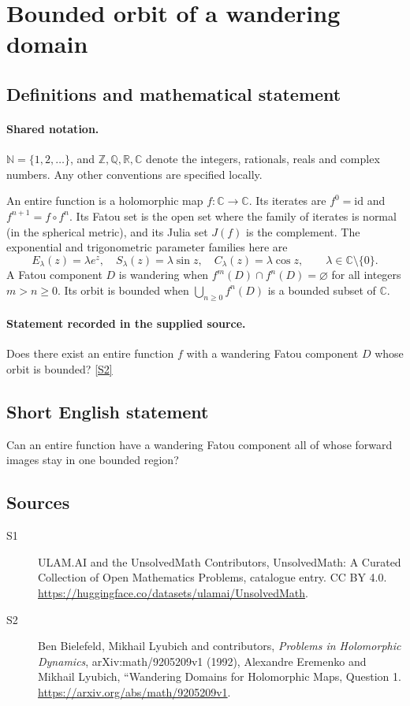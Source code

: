 \documentclass[11pt]{article}
\newcommand{\sref}[2]{\hyperlink{source:#1:#2}{[S#2]}}
\begin{document}
\section{Bounded orbit of a wandering domain}\label{statement}

\subsection{Definitions and mathematical statement}

\paragraph{Shared notation.}$\mathbb N=\{1,2,\ldots\}$, and $\mathbb Z,\mathbb Q,\mathbb R,\mathbb C$ denote the integers, rationals, reals and complex numbers. Any other conventions are specified locally.


An entire function is a holomorphic map $f:\mathbb C\to\mathbb C$. Its iterates are $f^0=\mathrm{id}$ and $f^{n+1}=f\circ f^n$. Its Fatou set is the open set where the family of iterates is normal (in the spherical metric), and its Julia set $J(f)$ is the complement. The exponential and trigonometric parameter families here are
\[E_\lambda(z)=\lambda e^z,\quad S_\lambda(z)=\lambda\sin z,\quad C_\lambda(z)=\lambda\cos z,\qquad \lambda\in\mathbb C\setminus\{0\}.\]A Fatou component $D$ is wandering when $f^m(D)\cap f^n(D)=\varnothing$ for all integers $m>n\geq0$. Its orbit is bounded when $\bigcup_{n\geq0}f^n(D)$ is a bounded subset of $\mathbb C$.
\paragraph{Statement recorded in the supplied source.}
Does there exist an entire function $f$ with a wandering Fatou component $D$ whose orbit is bounded? \sref{statement}{2}
\subsection{Short English statement}
Can an entire function have a wandering Fatou component all of whose forward images stay in one bounded region?
\subsection{Sources}
\begin{description}
\item[\hypertarget{source:statement:1}{S1}] ULAM.AI and the UnsolvedMath Contributors, UnsolvedMath: A Curated Collection of Open Mathematics Problems, catalogue entry. CC BY 4.0. \url{https://huggingface.co/datasets/ulamai/UnsolvedMath}.
\item[\hypertarget{source:statement:2}{S2}] Ben Bielefeld, Mikhail Lyubich and contributors, \emph{Problems in Holomorphic Dynamics}, arXiv:math/9205209v1 (1992), Alexandre Eremenko and Mikhail Lyubich, ``Wandering Domains for Holomorphic Maps, Question 1. \url{https://arxiv.org/abs/math/9205209v1}.
\end{description}
\label{end:statement}
\end{document}
